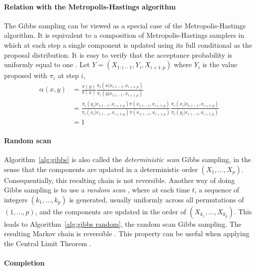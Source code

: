 \paragraph{Relation with the Metropolis-Hastings algorithm}

The Gibbs sampling can be viewed as a special case of the Metropolis-Hastings
algorithm. It is equivalent to a composition of Metropolis-Hastings samplers
in which at each step a single component is updated using its full conditional
as the proposal distribution. It is easy to verify that the acceptance
probability is uniformly equal to one \cite[][Theorem~10.13]{Robert:2004tn}.
Let $Y = (X_{1:i-1},Y_i,X_{i+1:p})$ where $Y_i$ is the value proposed with
$\pi_i$ at step $i$,
\begin{align*}
  \alpha(x,y) &= \frac{\pi(y)}{\pi(x)}
  \frac{\pi_i(x|x_{1:i-1},x_{i+1:p})}{\pi_i(y|x_{1:i-1},x_{i+1:p})} \\
  &= \frac{\pi_i(y_i|x_{1:i-1}, x_{i+1:p})\pi(x_{1:i-1},x_{i+1:p})}
  {\pi_i(x_i|x_{1:i-1}, x_{i+1:p})\pi(x_{1:i-1},x_{i+1:p})}
  \frac{\pi_i(x_i|x_{1:i-1}, x_{i+1:p})}{\pi_i(y_i|x_{1:i-1}, x_{i+1:p})} \\
  &= 1
\end{align*}

\paragraph{Random scan}

Algorithm~\ref{alg:gibbs} is also called the \emph{deterministic scan} Gibbs
sampling, in the sense that the components are updated in a deterministic
order $(X_1,\dots,X_p)$. Consequentially, this resulting chain is not
reversible. Another way of doing Gibbs sampling is to use a \emph{random scan}
\cite{Liu1995Gibbs}, where at each time $t$, a sequence of integers
$(k_1,\dots,k_p)$ is generated, usually uniformly across all permutations of
$(1,\dots,p)$, and the components are updated in the order of
$(X_{k_1},\dots,X_{k_p})$. This leads to Algorithm~\ref{alg:gibbs random}, the
random scan Gibbs sampling. The resulting Markov chain is reversible
\cite{Liu1995Gibbs}. This property can be useful when applying the Central
Limit Theorem \cite[][sec.~10.1.2]{Robert:2004tn}.



\paragraph{Completion}

